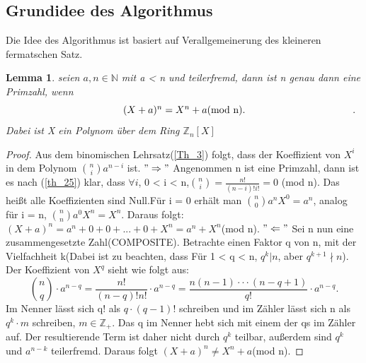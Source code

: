 \documentclass[12pt,oneside]{article}
\newtheorem{lemma}[theorem]{Lemma}
\theoremstyle{remark}
\theoremstyle{definition}
\begin{document}
\subsection{Grundidee des Algorithmus}
Die Idee des Algorithmus ist basiert auf  Verallgemeinerung des kleineren fermatschen Satz.
\begin{flushleft}
\begin{lemma}\label{hauptlemma}
seien $a,n \in \mathbb{N}$ mit a < n und teilerfremd, dann ist n genau dann eine Primzahl, wenn \newline
\begin{equation}\label{eq:1}
\centerline{ $(X + a)^n = X^n +a $(mod n).}.
\end{equation}\newline
Dabei ist X ein Polynom über dem Ring $\mathbb{Z}_{n}[X]$
\end{lemma}
\begin{proof}
Aus dem binomischen Lehrsatz(\ref{Th_3}) folgt, dass der Koeffizient von $X^i$ in dem Polynom ${n \choose i} a^{n-i}$ ist.\newline\newline
$"\Rightarrow"$\newline
Angenommen n ist eine Primzahl, dann ist es nach (\ref{th_25}) klar, dass $\forall i $, 0 < i < n,\newline\smallskip ${n \choose i} = \frac{n!}{(n-i)! i!} = 0 $ (mod n). Das heißt alle Koeffizienten sind Null.\newline\smallskip Für i = 0 erhält man  ${n \choose 0} a^n X^0 = a^n$, analog für i = n, ${n \choose n} a^0 X^n = X^n$. Daraus folgt:
$(X + a)^n = a^n + 0 + 0 + ... + 0 + X^n = a^n + X^n$(mod n).\newline\newline
$"\Leftarrow"$\newline
Sei n nun eine zusammengesetzte Zahl(COMPOSITE). Betrachte einen Faktor q von n, mit der Vielfachheit k(Dabei ist zu beachten, dass Für 1 < q < n, $q^k | n$, aber $q^{k+1} \nmid n$).\newline
Der Koeffizient von $X^q$ sieht wie folgt aus:\newline\smallskip
\begin{equation}
    {n \choose q} \cdot a^{n-q} = \frac{n!}{(n-q)! n!} \cdot a^{n-q} = \frac{n(n-1)\cdot \cdot \cdot (n-q+1)}{q!} \cdot a^{n-q}.
\end{equation}
\newline\newline
Im Nenner lässt sich q! als $q \cdot (q-1)!$ schreiben und im Zähler lässt sich n als $q^k\cdot m$ schreiben, $m \in \mathbb{Z}_{+}$. Das q im Nenner hebt sich mit einem der qs im Zähler auf. Der resultierende Term ist daher nicht durch $q^k$ teilbar, außerdem sind $q^k$ und $a^{n-k}$ teilerfremd. Daraus folgt $(X + a)^n \neq X^n + a $(mod n).
\end{proof}


\end{flushleft}
\end{document}
